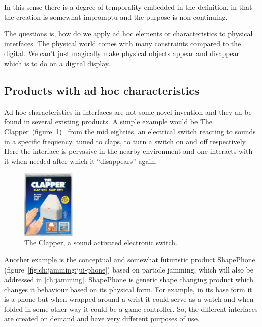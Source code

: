 In this sense there is a degree of temporality embedded in the definition, in that the creation is somewhat impromptu and the purpose is non-continuing.

The questions is, how do we apply ad hoc elements or characteristics to physical interfaces.
The physical world comes with many constraints compared to the digital.
We can't just magically make physical objects appear and disappear which is to do on a digital display.

\subsection{Products with ad hoc characteristics}
Ad hoc characteristics in interfaces are not some novel invention and they an be found in several existing products.
A simple example would be The Clapper~(figure~\ref{ch:adhoc:theclapper})~\cite{theclapperWIKIPEDIA} from the mid eighties, an electrical switch reacting to sounds in a specific frequency, tuned to claps, to turn a switch on and off respectively.
Here the interface is pervasive in the nearby environment and one interacts with it when needed after which it ``disappears'' again.

\begin{figure}[hb]
	\centering
  		\includegraphics[width=1in]{figures/theclapper}
	\caption[The Clapper, a sound activated electronic switch.]
   {The Clapper, a sound activated electronic switch.}
   \label{ch:adhoc:theclapper}
\end{figure}

Another example is the conceptual and somewhat futuristic product ShapePhone (figure~\ref{fig:ch:jamming:jui-phone}) based on particle jamming, which will also be addressed in \autoref{ch:jamming}.
ShapePhone is generic shape changing product which changes it behaviour based on its physical form.
For example, in its base form it is a phone but when wrapped around a wrist it could serve as a watch and when folded in some other way it could be a game controller.
So, the different interfaces are created on demand and have very different purposes of use.

